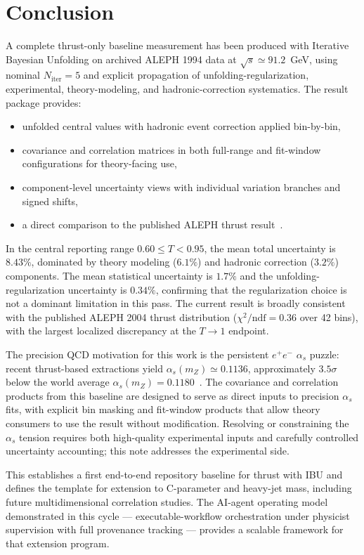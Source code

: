 \section{Conclusion}
\label{sec:conclusion}

A complete thrust-only baseline measurement has been produced with Iterative Bayesian Unfolding on archived ALEPH 1994 data at $\sqrt{s}\simeq91.2$~GeV, using nominal $N_{\mathrm{iter}}=5$ and explicit propagation of unfolding-regularization, experimental, theory-modeling, and hadronic-correction systematics. The result package provides:
\begin{itemize}
\item unfolded central values with hadronic event correction applied bin-by-bin,
\item covariance and correlation matrices in both full-range and fit-window configurations for theory-facing use,
\item component-level uncertainty views with individual variation branches and signed shifts,
\item a direct comparison to the published ALEPH thrust result~\cite{Heister:2003aj}.
\end{itemize}

In the central reporting range $0.60\le T<0.95$, the mean total uncertainty is $8.43\%$, dominated by theory modeling ($6.1\%$) and hadronic correction ($3.2\%$) components. The mean statistical uncertainty is $1.7\%$ and the unfolding-regularization uncertainty is $0.34\%$, confirming that the regularization choice is not a dominant limitation in this pass. The current result is broadly consistent with the published ALEPH 2004 thrust distribution ($\chi^2/\mathrm{ndf}=0.36$ over 42 bins), with the largest localized discrepancy at the $T\to 1$ endpoint.

The precision QCD motivation for this work is the persistent $e^{+}e^{-}$ $\alpha_s$ puzzle: recent thrust-based extractions yield $\alpha_s(m_Z)\simeq0.1136$, approximately $3.5\sigma$ below the world average $\alpha_s(m_Z)=0.1180$~\cite{Benitez:2024nav,ParticleDataGroup:2022pth}. The covariance and correlation products from this baseline are designed to serve as direct inputs to precision $\alpha_s$ fits, with explicit bin masking and fit-window products that allow theory consumers to use the result without modification. Resolving or constraining the $\alpha_s$ tension requires both high-quality experimental inputs and carefully controlled uncertainty accounting; this note addresses the experimental side.

This establishes a first end-to-end repository baseline for thrust with IBU and defines the template for extension to C-parameter and heavy-jet mass, including future multidimensional correlation studies.
The AI-agent operating model demonstrated in this cycle — executable-workflow orchestration under physicist supervision with full provenance tracking — provides a scalable framework for that extension program.

